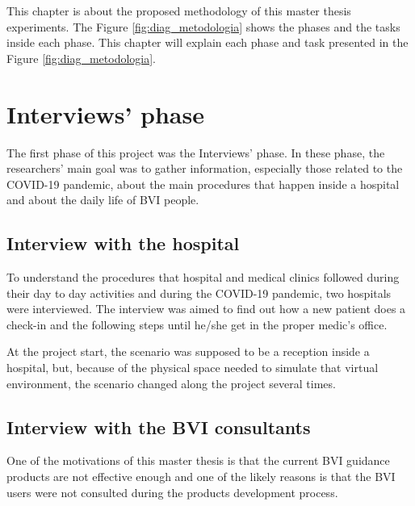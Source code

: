



This chapter is about the proposed methodology of this master thesis experiments. The Figure \ref{fig:diag_metodologia} shows the phases and the tasks inside each phase. This chapter will explain each phase and task presented in the Figure \ref{fig:diag_metodologia}.



\section{Interviews' phase}
\label{sec:interviews_phase}
    The first phase of this project was the Interviews' phase. In these phase, the researchers' main goal was to gather information, especially those related to the COVID-19 pandemic, about the main procedures that happen inside a hospital and about the daily life of BVI people.

    \subsection{Interview with the hospital}
    
        To understand the procedures that hospital and medical clinics followed during their day to day activities and during the COVID-19 pandemic, two hospitals were interviewed. The interview was aimed to find out how a new patient does a check-in and the following steps until he/she get in the proper medic's office.
        
        At the project start, the scenario was supposed to be a reception inside a hospital, but, because of the physical space needed to simulate that virtual environment, the scenario changed along the project several times.

    \subsection{Interview with the BVI consultants}
    
        One of the motivations of this master thesis is that the current BVI guidance products are not effective enough and one of the likely reasons is that the BVI users were not consulted during the products development process.
    
